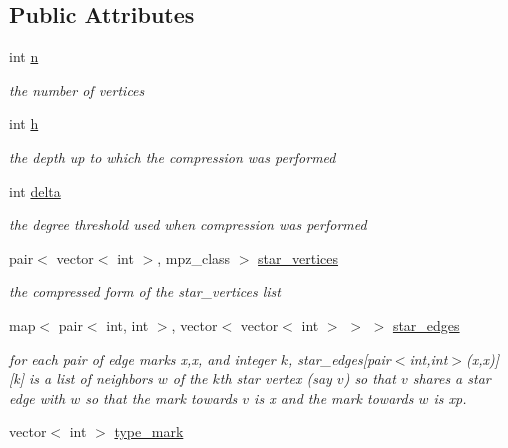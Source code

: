 \subsection*{Public Attributes}
\begin{DoxyCompactItemize}
\item 
int \hyperlink{classmarked__graph__compressed_a8d841016ddb11cfd33748c8deb6277ba}{n}
\begin{DoxyCompactList}\small\item\em the number of vertices \end{DoxyCompactList}\item 
int \hyperlink{classmarked__graph__compressed_af6ff623407b673d08d0cab77b39c2193}{h}
\begin{DoxyCompactList}\small\item\em the depth up to which the compression was performed \end{DoxyCompactList}\item 
int \hyperlink{classmarked__graph__compressed_a8b2aaac68e9332ddc78d88eb60b323a7}{delta}
\begin{DoxyCompactList}\small\item\em the degree threshold used when compression was performed \end{DoxyCompactList}\item 
pair$<$ vector$<$ int $>$, mpz\+\_\+class $>$ \hyperlink{classmarked__graph__compressed_a7a4ced4586e2e353f9076bd447df5208}{star\+\_\+vertices}
\begin{DoxyCompactList}\small\item\em the compressed form of the star\+\_\+vertices list \end{DoxyCompactList}\item 
map$<$ pair$<$ int, int $>$, vector$<$ vector$<$ int $>$ $>$ $>$ \hyperlink{classmarked__graph__compressed_a7df5779d313486644132bd816937f532}{star\+\_\+edges}
\begin{DoxyCompactList}\small\item\em for each pair of edge marks x,x\textquotesingle{}, and integer $k$, star\+\_\+edges\mbox{[}pair$<$int,int$>$(x,x\textquotesingle{})\mbox{]}\mbox{[}k\mbox{]} is a list of neighbors $w$ of the $k$th star vertex (say $v$) so that $v$ shares a star edge with $w$ so that the mark towards $v$ is x and the mark towards $w$ is xp. \end{DoxyCompactList}\item 
vector$<$ int $>$ \hyperlink{classmarked__graph__compressed_a86b00223525703e973415cbc9c94da68}{type\+\_\+mark}

\end{DoxyCompactItemize}
